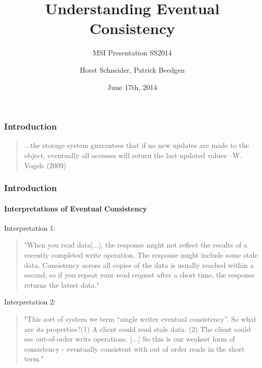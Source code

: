 \documentclass[11pt]{beamer}
\author{Horst Schneider, Patrick Beedgen}
\title{Understanding Eventual Consistency}
\subtitle{MSI Presentation SS2014}
\institute{Hochschule Mannheim}
\date{June 17th, 2014}
\begin{document}
\begin{frame}
\titlepage
\end{frame}

\begin{frame}
\frametitle{Introduction}
\begin{quotation}
\glqq ...the 
storage system guarantees that if no 
new updates are made to the object, 
eventually all accesses will return the 
last updated valuee\grqq
\linebreak
--W. Vogels (2009)
\end{quotation}
\end{frame}

\begin{frame}
\frametitle{Introduction}
\framesubtitle{Interpretations of Eventual Consistency}
\begin{footnotesize}
Interpretation 1:
\begin{quotation}
"When you read data[...], the response might not reflect the results of a recently completed write operation. The response might include some stale data. Consistency across all copies of the data is usually reached within a second; so if you repeat your read request after a short time, the response returns the latest data."
\end{quotation}

Interpretation 2:
\begin{quotation}
"This sort of system we term “single writer eventual consistency”.  So what are its properties?\linebreak (1) A client could read stale data. (2) The client could see out-of-order write operations. [...] So this is our weakest form of consistency - eventually consistent with out of order reads in the short term."
\end{quotation}
\end{footnotesize}
\end{frame}
\end{document}
